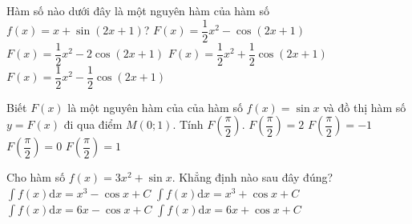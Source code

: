 \begin{ex}%
	Hàm số nào dưới đây là một nguyên hàm  của hàm số $f(x)=x+\sin (2x+1)$?
	 \choice
		{$F(x)=\dfrac{1}{2}x^2-\cos (2x+1)$} 
		{$F(x)=\dfrac{1}{2}x^2-2\cos (2x+1)$} 
		{$F(x)=\dfrac{1}{2}x^2+\dfrac{1}{2}\cos  (2x+1)$}
		 {\True $F(x)=\dfrac{1}{2}x^2-\dfrac{1}{2}\cos (2x+1)$}
\end{ex}

\begin{ex}%
	Biết $F(x)$ là một nguyên hàm của của hàm số $f(x)=\sin x$ và đồ thị hàm số  $y=F(x)$ đi qua điểm $M(0;1)$. Tính $F\left(\dfrac{\pi}{2}\right)$.
	 \choice
		{\True  $F\left(\dfrac{\pi}{2}\right)=2$}
		 {$F\left(\dfrac{\pi}{2}\right)=-1$}
		 {$F\left(\dfrac{\pi}{2}\right)=0$}
		{$F\left(\dfrac{\pi}{2}\right)=1$} 
\end{ex}

\begin{ex}%
	Cho hàm số $f(x)=3x^2+\sin  x$. Khẳng định nào sau đây đúng?
	 \choice
		{\True $\displaystyle\int f(x) \mathrm{d}x=x^3-\cos  x+C$}
		 {$\displaystyle\int f(x) \mathrm{d}x=x^3+\cos x+C$}
		 {$\displaystyle\int f(x) \mathrm{d}x=6x-\cos x+C$}
		{$\displaystyle\int f(x)  \mathrm{d}x=6x+\cos x+C$}
\end{ex}

